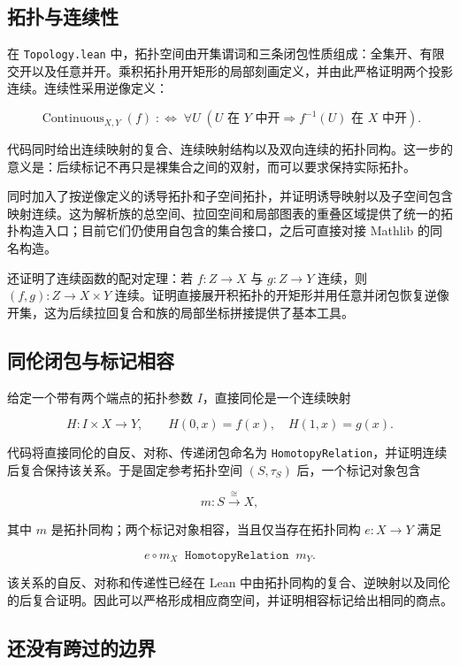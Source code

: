 \documentclass[UTF8,fontset=none,a4paper,11pt]{ctexart}
\begin{document}
\subsection{拓扑与连续性}

在 \texttt{Topology.lean} 中，拓扑空间由开集谓词和三条闭包性质组成：全集开、有限交开以及任意并开。乘积拓扑用开矩形的局部刻画定义，并由此严格证明两个投影连续。连续性采用逆像定义：

\[
\operatorname{Continuous}_{X,Y}(f)
\;:\Longleftrightarrow\;
\forall U\;(U\text{ 在 }Y\text{ 中开}\Rightarrow f^{-1}(U)\text{ 在 }X\text{ 中开}).
\]

代码同时给出连续映射的复合、连续映射结构以及双向连续的拓扑同构。这一步的意义是：后续标记不再只是裸集合之间的双射，而可以要求保持实际拓扑。

同时加入了按逆像定义的诱导拓扑和子空间拓扑，并证明诱导映射以及子空间包含映射连续。这为解析族的总空间、拉回空间和局部图表的重叠区域提供了统一的拓扑构造入口；目前它们仍使用自包含的集合接口，之后可直接对接 Mathlib 的同名构造。

还证明了连续函数的配对定理：若 $f:Z\to X$ 与 $g:Z\to Y$ 连续，则 $(f,g):Z\to X\times Y$ 连续。证明直接展开积拓扑的开矩形并用任意并闭包恢复逆像开集，这为后续拉回复合和族的局部坐标拼接提供了基本工具。

\subsection{同伦闭包与标记相容}

给定一个带有两个端点的拓扑参数 $I$，直接同伦是一个连续映射

\[
H:I\times X\longrightarrow Y,
\qquad H(0,x)=f(x),\quad H(1,x)=g(x).
\]

代码将直接同伦的自反、对称、传递闭包命名为 \texttt{HomotopyRelation}，并证明连续后复合保持该关系。于是固定参考拓扑空间 $(S,\tau_S)$ 后，一个标记对象包含

\[
m:S\xrightarrow{\cong}X,
\]

其中 $m$ 是拓扑同构；两个标记对象相容，当且仅当存在拓扑同构 $e:X\to Y$ 满足

\[
e\circ m_X\;\mathrel{\texttt{HomotopyRelation}}\;m_Y.
\]

该关系的自反、对称和传递性已经在 Lean 中由拓扑同构的复合、逆映射以及同伦的后复合证明。因此可以严格形成相应商空间，并证明相容标记给出相同的商点。

\subsection{还没有跨过的边界}
\end{document}
